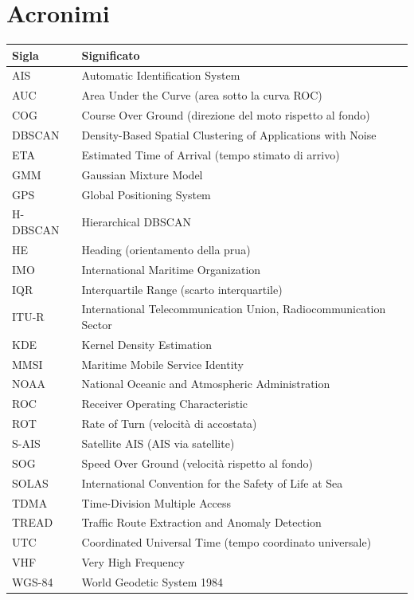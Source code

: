 \chapter*{Acronimi}

\begin{center}
\begin{tabular}{@{}l>{\raggedright\arraybackslash}p{12.3cm}@{}}
\toprule
\textbf{Sigla} & \textbf{Significato} \\
\midrule
AIS      & Automatic Identification System \\
AUC      & Area Under the Curve (area sotto la curva ROC) \\
COG      & Course Over Ground (direzione del moto rispetto al fondo) \\
DBSCAN   & Density-Based Spatial Clustering of Applications with Noise \\
ETA      & Estimated Time of Arrival (tempo stimato di arrivo) \\
GMM      & Gaussian Mixture Model \\
GPS      & Global Positioning System \\
H-DBSCAN & Hierarchical DBSCAN \\
HE       & Heading (orientamento della prua) \\
IMO      & International Maritime Organization \\
IQR      & Interquartile Range (scarto interquartile) \\
ITU-R    & International Telecommunication Union, Radiocommunication Sector \\
KDE      & Kernel Density Estimation \\
MMSI     & Maritime Mobile Service Identity \\
NOAA     & National Oceanic and Atmospheric Administration \\
ROC      & Receiver Operating Characteristic \\
ROT      & Rate of Turn (velocità di accostata) \\
S-AIS    & Satellite AIS (AIS via satellite) \\
SOG      & Speed Over Ground (velocità rispetto al fondo) \\
SOLAS    & International Convention for the Safety of Life at Sea \\
TDMA     & Time-Division Multiple Access \\
TREAD    & Traffic Route Extraction and Anomaly Detection \\
UTC      & Coordinated Universal Time (tempo coordinato universale) \\
VHF      & Very High Frequency \\
WGS-84   & World Geodetic System 1984 \\
\bottomrule
\end{tabular}
\end{center}
